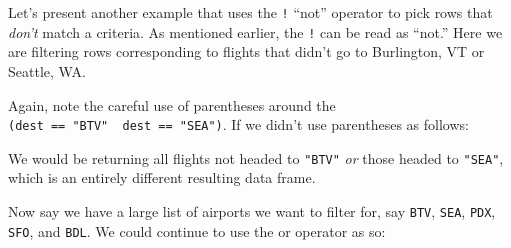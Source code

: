 \documentclass[12pt, krantz2,]{krantz}
\makeatletter
\newenvironment{Shaded}{\begin{snugshade}}{\end{snugshade}}
\newcommand{\KeywordTok}[1]{\textcolor[rgb]{0.27,0.27,0.27}{\textbf{#1}}}
\newcommand{\NormalTok}[1]{#1}
\newcommand{\OperatorTok}[1]{\textcolor[rgb]{0.43,0.43,0.43}{\textbf{#1}}}
\newcommand{\StringTok}[1]{\textcolor[rgb]{0.5,0.5,0.5}{#1}}
\newenvironment{kframe}{%
\medskip{}
\setlength{\fboxsep}{.8em}
 \def\at@end@of@kframe{}%
 \ifinner\ifhmode%
  \def\at@end@of@kframe{\end{minipage}}%
  \begin{minipage}{\columnwidth}%
 \fi\fi%
 \def\FrameCommand##1{\hskip\@totalleftmargin \hskip-\fboxsep
 \colorbox{shadecolor}{##1}\hskip-\fboxsep
     \hskip-\linewidth \hskip-\@totalleftmargin \hskip\columnwidth}%
 \MakeFramed {\advance\hsize-\width
   \@totalleftmargin\z@ \linewidth\hsize
   \@setminipage}}%
 {\par\unskip\endMakeFramed%
 \at@end@of@kframe}
\renewenvironment{Shaded}{\begin{kframe}}{\end{kframe}}
\makeatother
\begin{document}
Let's present another example that uses the \texttt{!} ``not'' operator to pick rows that \emph{don't} match a criteria. As mentioned earlier, the \texttt{!} can be read as ``not.'' Here we are filtering rows corresponding to flights that didn't go to Burlington, VT or Seattle, WA.

\begin{Shaded}
\end{Shaded}

Again, note the careful use of parentheses around the \texttt{(dest\ ==\ "BTV"\ \textbar{}\ dest\ ==\ "SEA")}. If we didn't use parentheses as follows:

\begin{Shaded}
\end{Shaded}

We would be returning all flights not headed to \texttt{"BTV"} \emph{or} those headed to \texttt{"SEA"}, which is an entirely different resulting data frame.

Now say we have a large list of airports we want to filter for, say \texttt{BTV}, \texttt{SEA}, \texttt{PDX}, \texttt{SFO}, and \texttt{BDL}. We could continue to use the \texttt{\textbar{}} or operator as so:

\begin{Shaded}
\end{Shaded}
\end{document}
